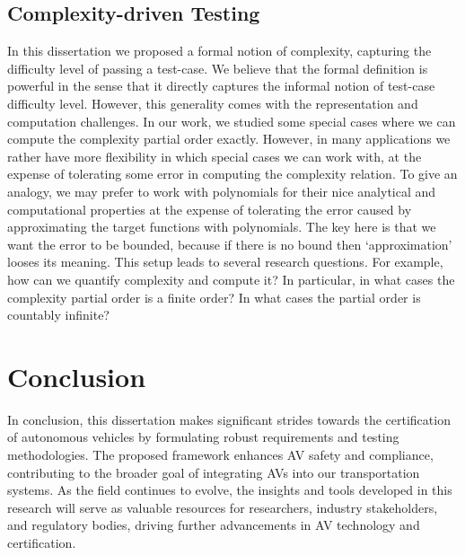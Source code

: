 \subsection{Complexity-driven Testing}
In this dissertation we proposed a formal notion of complexity, capturing the difficulty level of passing a test-case.
%
We believe that the formal definition is powerful in the sense that it directly captures the informal notion of test-case difficulty level.
%
However, this generality comes with the representation and computation challenges.
%
In our work, we studied some special cases where we can compute the complexity partial order exactly.
% 
However, in many applications we rather have more flexibility in which special cases we can work with, at the expense of tolerating some error in computing the complexity relation.
%
To give an analogy, we may prefer to work with polynomials for their nice analytical and computational properties at the expense of tolerating the error caused by approximating the target functions with polynomials.
%
The key here is that we want the error to be bounded, because if there is no bound then `approximation' looses its meaning.
%
This setup leads to several research questions.
%
For example, how can we quantify complexity and compute it?
%
In particular, in what cases the complexity partial order is a finite order?
%
In what cases the partial order is countably infinite?



\section{Conclusion}

In conclusion, this dissertation makes significant strides towards the certification of autonomous vehicles by formulating robust requirements and testing methodologies. The proposed framework enhances AV safety and compliance, contributing to the broader goal of integrating AVs into our transportation systems. As the field continues to evolve, the insights and tools developed in this research will serve as valuable resources for researchers, industry stakeholders, and regulatory bodies, driving further advancements in AV technology and certification.
